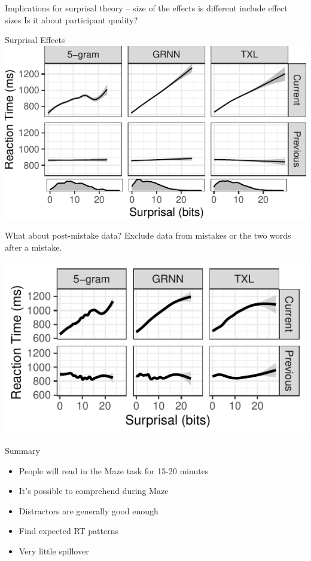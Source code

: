 \documentclass[12pt, xcolor=beamer,table,usenames,dvipsnames, ignorenonframetext, ngerman]{beamer}
\begin{document}
\begin{frame}
	Implications for surprisal theory -- size of the effects is different
	include effect sizes
	Is it about participant quality?
\end{frame}

\begin{frame}{Surprisal Effects}
\includegraphics[width=.9\textwidth]{../gam.pdf}	
\end{frame}
\begin{frame}{What about post-mistake data?}
Exclude data from mistakes or the two words after a mistake. 

\includegraphics[width=.9\textwidth]{../gam2.pdf}	
\end{frame}

\begin{frame}{Summary}
\begin{itemize}\pause
	\item People will read in the Maze task for 15-20 minutes \pause
	\item It's possible to comprehend during Maze \pause
	\item Distractors are generally good enough \pause
	\item Find expected RT patterns \pause
	\item Very little spillover
\end{itemize}
\end{frame}
\end{document}
